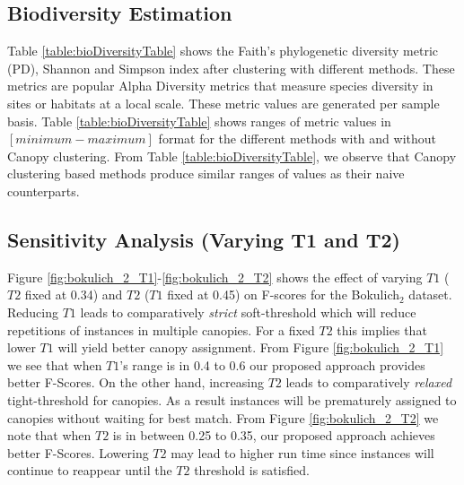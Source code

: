 \documentclass[letterpaper,twocolumn]{article}
\begin{document}
\subsection{Biodiversity Estimation} Table \ref{table:bioDiversityTable} shows the Faith’s phylogenetic diversity metric (PD), Shannon and Simpson index after clustering
with different methods. These metrics are 
popular Alpha Diversity metrics that measure species diversity in sites or habitats at 
a local scale. These metric values are generated per sample basis. Table \ref{table:bioDiversityTable} shows ranges of metric values
in $[minimum-maximum]$ format  for the different 
methods with and without Canopy clustering. From Table  \ref{table:bioDiversityTable}, we observe 
that Canopy clustering based methods produce similar ranges of values as their naive counterparts.

\subsection{Sensitivity Analysis (Varying T1 and T2)}
Figure \ref{fig:bokulich_2_T1}-\ref{fig:bokulich_2_T2} shows the 
effect of varying $T1$ ($T2$ fixed at 0.34) and $T2$ ($T1$ fixed at 0.45) on F-scores for the Bokulich$_2$ dataset. Reducing $T1$ leads to
comparatively \textit{strict} soft-threshold which will reduce 
repetitions of instances in multiple canopies. For a fixed $T2$ this implies that 
lower $T1$ will yield better canopy assignment. From Figure \ref{fig:bokulich_2_T1} we see that 
when $T1$'s range is in 0.4 to 0.6 our proposed approach provides better 
F-Scores. On the other hand, increasing $T2$ leads to comparatively \textit{relaxed} tight-threshold for canopies. As a result instances will be prematurely assigned to canopies without waiting for best match. From Figure \ref{fig:bokulich_2_T2} we note that 
when $T2$  is in between 0.25 to 0.35, 
our proposed approach achieves better F-Scores. Lowering 
$T2$ may lead to higher run time since instances will continue to reappear 
until the $T2$ threshold is satisfied.                   
\end{document}
